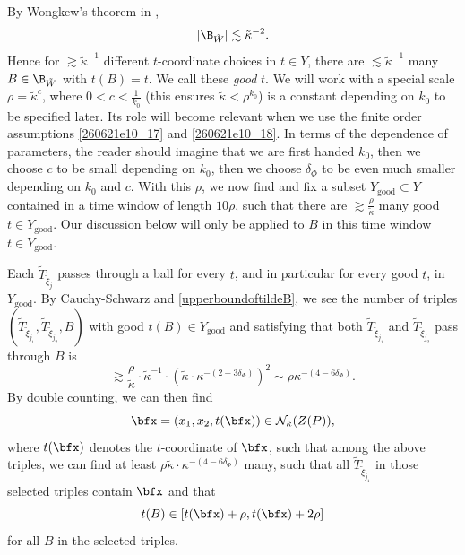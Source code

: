 \documentclass{article}
\numberwithin{equation}{section}
\theoremstyle{plain}
\begin{document}
By Wongkew's theorem in \cite{wongkew1993volumes}, 
\begin{equation}\label{upperboundoftildeB}
    |\B_{\tilde{W}}|\lesssim \tilde{\kappa}^{-2}.
\end{equation}
Hence for $\gtrsim \tilde{\kappa}^{-1}$ different $t$-coordinate choices in $t \in Y$, there are $\lesssim \tilde{\kappa}^{-1}$ many $B \in \B_{\tilde{W}}$ with $t(B) = t$. We call these \emph{good} $t$. We will work with a special scale $\rho = \tilde{\kappa}^{c}$, where $0<c< \frac{1}{k_0}$ (this ensures $\tilde{\kappa} < \rho^{k_0}$) is a constant depending on $k_0$ to be specified later. Its role will become relevant when we use the finite order assumptions \eqref{260621e10_17} and \eqref{260621e10_18}. In terms of the dependence of parameters, the reader should imagine that we are first handed $k_0$, then we choose $c$ to be small depending on $k_0$, then we choose $\delta_{\Phi}$ to be even much smaller depending on $k_0$ and $c$. With this $\rho$, we now find and fix a subset $Y_{\text{good}}\subset Y$ contained in a time window of length $10\rho$, such that there are $\gtrsim \frac{\rho}{\tilde{\kappa}}$ many good $t \in Y_{\text{good}}$. Our discussion below will only be applied to $B$ in this time window $t \in Y_{\text{good}}$.


Each $\tilde{T}_{\tilde{\xi}_j}$ passes through a ball for every $t$, and in particular for every good $t$, in $Y_{\text{good}}$. By Cauchy-Schwarz and \eqref{upperboundoftildeB}, we see the number of triples $(\tilde{T}_{\tilde{\xi}_{j_1}}, \tilde{T}_{\tilde{\xi}_{j_2}}, B)$ with good $t(B) \in Y_{\text{good}}$  and satisfying that both $\tilde{T}_{\tilde{\xi}_{j_1}}$ and $\tilde{T}_{\tilde{\xi}_{j_2}}$ pass through $B$ is
\begin{equation}
    \gtrsim \frac{\rho}{\tilde{\kappa}}\cdot \tilde{\kappa}^{-1}\cdot(\tilde{\kappa}\cdot \kappa^{-(2-3\delta_{\Phi})})^2\sim \rho \kappa^{-(4-6\delta_{\Phi})}.
\end{equation}
By double counting, we can then find %
 \begin{equation}
     \bfx = (x_1, x_2, t(\bfx)) \in \mathcal{N}_{\tilde{\kappa}}(Z(P)),
 \end{equation}
 where $t(\bfx)$ denotes the $t$-coordinate of $\bfx$, 
 such that among the above triples, we can find at least $\rho\tilde{\kappa}\cdot \kappa^{-(4-6\delta_{\Phi})}$ many, such that all $\tilde{T}_{\tilde{\xi}_{j_1}}$ in those selected triples contain $\bfx$ and that 
 \begin{equation}
     t(B) \in [t(\bfx)+\rho, t(\bfx)+2\rho]
 \end{equation}
 for all $B$ in the selected triples.
\end{document}
